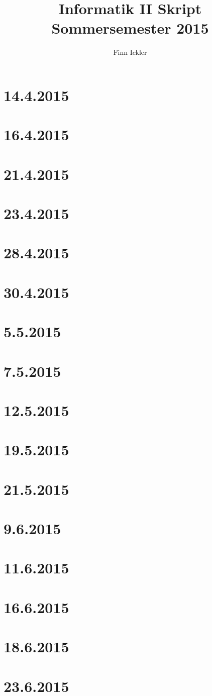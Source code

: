 \documentclass[a4paper,12pt,twoside]{article}
\author{Finn Ickler}
\title{Informatik II Skript Sommersemester 2015}
\begin{document}
	\graphicspath{{./Graphics/}}
\renewcommand{\underline}[1]{\emph{#1}}
\renewcommand{\uline}[1]{\emph{#1}}
\maketitle
\tableofcontents
\lstlistoflistings
\newpage
\section{14.4.2015}

\section{16.4.2015}

\section{21.4.2015}

\section{23.4.2015}

\section{28.4.2015}

\section{30.4.2015}

\section{5.5.2015}

\section{7.5.2015}

\section{12.5.2015}

\section{19.5.2015}

\section{21.5.2015}

\section{9.6.2015}

\section{11.6.2015}

\newpage
\section{16.6.2015}

\section{18.6.2015}

\section{23.6.2015}

\end{document}
